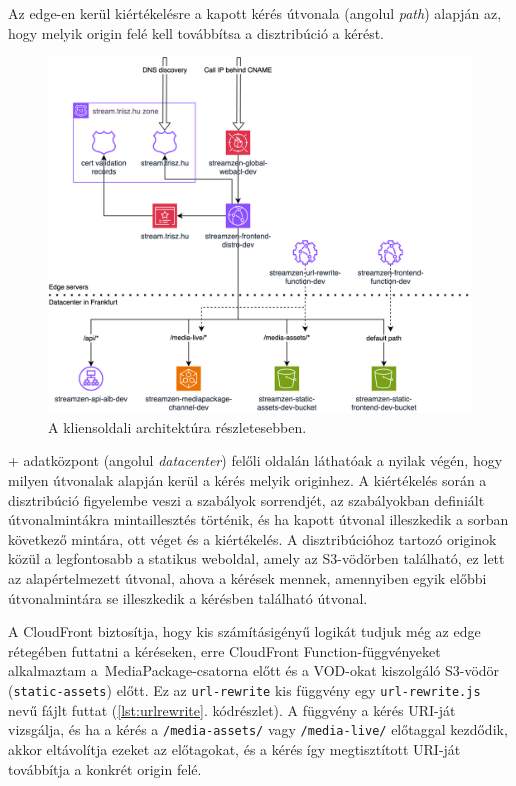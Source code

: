Az edge-en kerül kiértékelésre a kapott kérés útvonala (angolul \emph{path}) alapján az, hogy melyik origin felé kell továbbítsa a disztribúció a kérést.

\begin{figure}[h]
  \centering
  \includegraphics[width=150mm, keepaspectratio]{figures/dipterv_client.png}
  \caption{A kliensoldali architektúra részletesebben.}
  \label{fig:client}
\end{figure}

\Az+ adatközpont (angolul \emph{datacenter}) felőli oldalán láthatóak a nyilak végén, hogy milyen útvonalak alapján kerül a kérés melyik originhez. A kiértékelés során a disztribúció figyelembe veszi a szabályok sorrendjét, az szabályokban definiált útvonalmintákra mintaillesztés történik, és ha kapott útvonal illeszkedik a sorban következő mintára, ott véget és a kiértékelés. A disztribúcióhoz tartozó originok közül a legfontosabb a statikus weboldal, amely az S3-vödörben található, ez lett az alapértelmezett útvonal, ahova a kérések mennek, amennyiben egyik előbbi útvonalmintára se illeszkedik a kérésben található útvonal.

A CloudFront biztosítja, hogy kis számításigényű logikát tudjuk még az edge rétegében futtatni a kéréseken, erre CloudFront Function-függvényeket alkalmaztam a~MediaPackage-csatorna előtt és a VOD-okat kiszolgáló S3-vödör (\verb|static-assets|) előtt. Ez az \verb|url-rewrite| kis függvény egy \verb|url-rewrite.js| nevű fájlt futtat (\ref{lst:urlrewrite}. kódrészlet). A függvény a kérés URI-ját vizsgálja, és ha a kérés a \verb|/media-assets/| vagy \verb|/media-live/| előtaggal kezdődik, akkor eltávolítja ezeket az előtagokat, és a kérés így megtisztított URI-ját továbbítja a konkrét origin felé.

